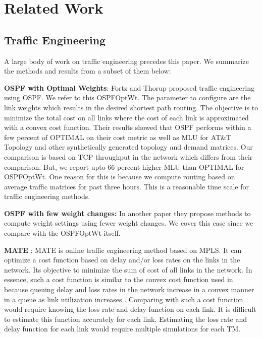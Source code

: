 \section{Related Work}

\subsection{Traffic Engineering }
A large body of work on traffic engineering precedes this paper. We summarize the methods and results from a subset of them below:


 \textbf{OSPF with Optimal Weights}: Fortz and Thorup proposed traffic engineering using OSPF. We refer to this OSPFOptWt. The parameter to configure are the link weights which results in the desired shortest path routing. The objective is to minimize the total cost on all links where the cost of  each link is approximated with a convex cost function. Their results showed that OSPF performs within a few percent of OPTIMAL on their cost metric as well as MLU for AT\&T  Topology and other synthetically generated topology and demand matrices. Our comparison is based on TCP throughput in the network which differs from their comparison. But, we report upto 66 percent higher MLU than OPTIMAL for OSPFOptWt. One reason for this is because we compute routing based on average traffic matrices for past three hours. This is a reasonable time scale for traffic engineering methods.

\textbf{OSPF with few weight changes:} In another paper \cite{FortzThorup2} they propose methods to compute weight settings using fewer weight changes. We cover this case since we compare with the OSPFOptWt itself.


\textbf{MATE }: MATE \cite{MATE}  is online traffic engineering method based on MPLS. It can optimize a cost function based on delay and/or loss rates on the links in the network. Its objective to minimize the sum of cost of all links in the network. In essence, such a cost function is similar to the convex cost function used in \cite{FortzThorup} because queuing delay and loss rates in the network increase in a convex manner in a queue as link utilization increases \cite{queue}. Comparing with such a cost function would require knowing the loss rate and delay function on each link. It is difficult to estimate this function accurately for each link.  Estimating the loss rate and delay function for each link would require multiple simulations for each TM.

